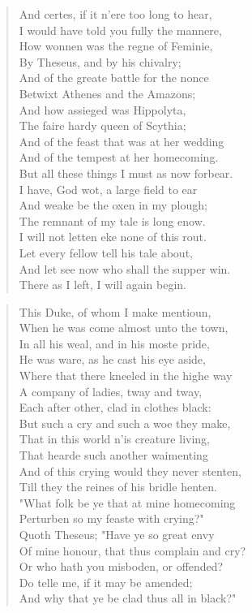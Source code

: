 \documentclass{article}
\begin{document}
\begin{verse}
\textpilcrow{}\thinspace{}And certes, if it n'ere too long to hear,\\
I would have told you fully the mannere,\\
How wonnen was the regne of Feminie,\\
By Theseus, and by his chivalry;\\
And of the greate battle for the nonce\\
Betwixt Athenes and the Amazons;\\
And how assieged was Hippolyta,\\
The faire hardy queen of Scythia;\\
And of the feast that was at her wedding\\
And of the tempest at her homecoming.\\
But all these things I must as now forbear.\\
I have, God wot, a large field to ear\\
And weake be the oxen in my plough;\\
The remnant of my tale is long enow.\\
I will not letten eke none of this rout.\\
Let every fellow tell his tale about,\\
And let see now who shall the supper win.\\
There as I left, I will again begin.
\end{verse}

\begin{verse}
\textpilcrow{}\thinspace{}This Duke, of whom I make mentioun,\\
When he was come almost unto the town,\\
In all his weal, and in his moste pride,\\
He was ware, as he cast his eye aside,\\
Where that there kneeled in the highe way\\
A company of ladies, tway and tway,\\
Each after other, clad in clothes black:\\
But such a cry and such a woe they make,\\
That in this world n'is creature living,\\
That hearde such another waimenting\\
And of this crying would they never stenten,\\
Till they the reines of his bridle henten.\\
"What folk be ye that at mine homecoming\\
Perturben so my feaste with crying?"\\
Quoth Theseus; "Have ye so great envy\\
Of mine honour, that thus complain and cry?\\
Or who hath you misboden, or offended?\\
Do telle me, if it may be amended;\\
And why that ye be clad thus all in black?"
\end{verse}
\end{document}
